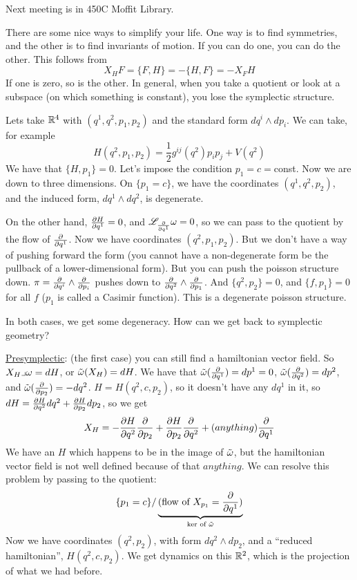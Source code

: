  \setcounter{lecture}{13}

 Next meeting is in 450C Moffit Library.

 There are some nice ways to simplify your life.  One way is to
 find symmetries, and the other is to find invariants of motion.
 If you can do one, you can do the other.  This follows from
 \[
    X_H F=\{F,H\} = -\{H,F\} = -X_F H
 \]
 If one is zero, so is the other.  In general, when you take a
 quotient or look at a subspace (on which something is constant),
 you lose the symplectic structure.

 Lets take $\mathbb{R}^4$ with $(q^1,q^2,p_1,p_2)$ and the standard form
 $dq^i\wedge dp_i$.  We can take, for example
 \[
    H(q^2,p_1,p_2)=\frac{1}{2}g^{ij}(q^2)p_ip_j+V(q^2)
 \]
 We have that $\{H,p_1\}=0$.  Let's impose the condition
 $p_1=c=$const.  Now we are down to three dimensions.  On
 $\{p_1=c\}$, we have the coordinates $(q^1,q^2,p_2)$, and the
 induced form, $dq^1\wedge dq^2$, is degenerate.

 On the other hand, $\frac{\partial H}{\partial q^1}=0$, and $\mathscr{L}_{\frac{\partial }{\partial q^1}}\omega=0$, so we can pass to
 the quotient by the flow of $\frac{\partial }{\partial q^1}$.  Now we have
 coordinates $(q^2,p_1,p_2)$.  But we don't have a way of pushing
 forward the form (you cannot have a non-degenerate form be the
 pullback of a lower-dimensional form).  But you can push the
 poisson structure down.  $\pi=\frac{\partial }{\partial q^i}\wedge \frac{\partial }{\partial p_i}$
 pushes down to $\frac{\partial }{\partial q^2}\wedge\frac{\partial }{\partial p_1}$.  And
 $\{q^2,p_2\}=0$, and $\{f,p_1\}=0$ for all $f$ ($p_1$ is called a
 Casimir function).  This is a degenerate poisson structure.

 In both cases, we get some degeneracy.  How can we get back to
 symplectic geometry?

 \underline{Presymplectic}: (the first case)  you can still find a
 hamiltonian vector field.  So $X_H\lrcorner \omega=dH$, or $\tilde
 {\omega}(X_H)=dH$.  We have that $\tilde{\omega}(\frac{\partial }{\partial q^1})=dp^1=0$,
 $\tilde{\omega}(\frac{\partial }{\partial q^2})=dp^2$, and
 $\tilde{\omega}(\frac{\partial }{\partial p_2})=-dq^2$.  $H=H(q^2,c,p_2)$, so it doesn't
 have any $dq^1$ in it, so $dH=\frac{\partial H}{\partial q^2}dq^2 +
 \frac{\partial H}{\partial p_2}dp_2$, so we get
 \[
    X_H = -\frac{\partial H}{\partial q^2}\frac{\partial }{\partial p_2} + \frac{\partial H}{\partial p_2}\frac{\partial }{\partial q^2} +
    (anything)\frac{\partial }{\partial q^1}
 \]
 We have an $H$ which happens to be in the image of $\tilde {\omega}$,
 but the hamiltonian vector field is not well defined because of
 that $anything$.  We can resolve this problem by passing to the
 quotient:
 \[
    \{p_1=c\}/\underbrace{(\text{flow of }X_{p_1}=\frac{\partial }{\partial q^1}
    )}_{\text{ker of }\tilde {\omega}}
 \]
 Now we have coordinates $(q^2,p_2)$, with form $dq^2\wedge dp_2$,
 and a ``reduced hamiltonian'', $H(q^2,c,p_2)$.  We get dynamics
 on this $\mathbb{R}^2$, which is the projection of what we had before.

